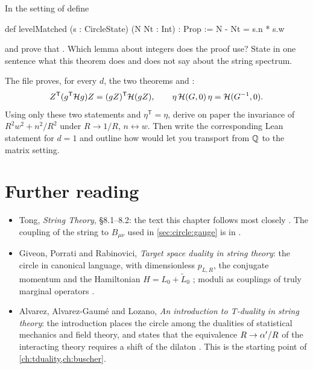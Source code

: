 \begin{exercise}
In the setting of  define
\begin{leancode}
def levelMatched (s : CircleState) (N Nt : Int) : Prop := N - Nt = s.n * s.w
\end{leancode}
and prove that . Which lemma
about integers does the proof use? State in one sentence what this theorem does and does not
say about the string spectrum.
\end{exercise}

\begin{exercise}
The file  proves, for every $d$, the two theorems
 and :
\[
 Z^{\mathsf T}(g^{\mathsf T}\mathcal{H} g)Z=(gZ)^{\mathsf T}\mathcal{H}(gZ),\qquad
 \eta\,\mathcal{H}(G,0)\,\eta=\mathcal{H}(G^{-1},0).
\]
Using only these two
statements and $\eta^{\mathsf T}=\eta$, derive on paper the invariance of
$R^2w^2+n^2/R^2$ under $R\to1/R$, $n\leftrightarrow w$. Then write the corresponding Lean
statement for $d=1$ and outline how  would let you transport
 from $\mathbb{Q}$ to the matrix setting.
\end{exercise}

\section*{Further reading}

\begin{itemize}[leftmargin=*]
\item Tong, \emph{String Theory}, §8.1--8.2: the text this chapter follows most closely
. The coupling of the string to $B_{\mu\nu}$ used
in \cref{sec:circle:gauge} is in .
\item Giveon, Porrati and Rabinovici, \emph{Target space duality in string theory}: the
circle in canonical language, with dimensionless $p_{L,R}$, the conjugate momentum and the
Hamiltonian $H=L_0+\tilde L_0$ ; moduli as couplings of truly
marginal operators .
\item Alvarez, Alvarez-Gaum\'e and Lozano, \emph{An introduction to T-duality in string
theory}: the introduction places the circle among the dualities of statistical mechanics and
field theory, and states that the equivalence $R\to\alpha'/R$ of the interacting theory requires
a shift of the dilaton . This is the starting point of
\cref{ch:tduality,ch:buscher}.
\end{itemize}

